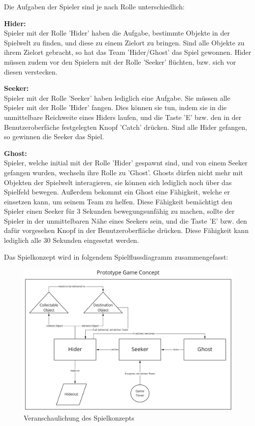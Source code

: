 Die Aufgaben der Spieler sind je nach Rolle unterschiedlich:

\textbf{Hider:} \\
Spieler mit der Rolle 'Hider' haben die Aufgabe, bestimmte Objekte in der Spielwelt zu finden, und diese zu einem Zielort zu bringen. Sind alle Objekte zu ihrem Zielort gebracht, so hat das Team 'Hider/Ghost' das Spiel gewonnen. Hider müssen zudem vor den Spielern mit der Rolle 'Seeker' flüchten, bzw. sich vor diesen verstecken. 

\textbf{Seeker:} \\
Spieler mit der Rolle 'Seeker' haben lediglich eine Aufgabe. Sie müssen alle Spieler mit der Rolle 'Hider' fangen. Dies können sie tun, indem sie in die unmittelbare Reichweite eines Hiders laufen, und die Taste 'E' bzw. den in der Benutzeroberfäche festgelegten Knopf 'Catch' drücken. Sind alle Hider gefangen, so gewinnen die Seeker das Spiel.

\textbf{Ghost:} \\
Spieler, welche initial mit der Rolle 'Hider' gespawnt sind, und von einem Seeker gefangen wurden, wechseln ihre Rolle zu 'Ghost'. Ghosts dürfen nicht mehr mit Objekten der Spielwelt interagieren, sie können sich lediglich noch über das Spielfeld bewegen. Außerdem bekommt ein Ghost eine Fähigkeit, welche er einsetzen kann, um seinem Team zu helfen. Diese Fähigkeit bemächtigt den Spieler einen Seeker für 3 Sekunden bewegungsunfähig zu machen, sollte der Spieler in der unmittelbaren Nähe eines Seekers sein, und die Taste 'E' bzw. den dafür vorgesehen Knopf in der Benutzeroberfläche drücken. Diese Fähigkeit kann lediglich alle 30 Sekunden eingesetzt werden.

Das Spielkonzept wird in folgendem Spielflussdiagramm zusammengefasst:

\begin{figure}[H]
	\centering
	\includegraphics[width=150mm]{images/game_concept.jpg}
	\caption[Spielkonzept Diagramm]{Veranschaulichung des Spielkonzepts}
	\label{pic:game_concept}
\end{figure}

